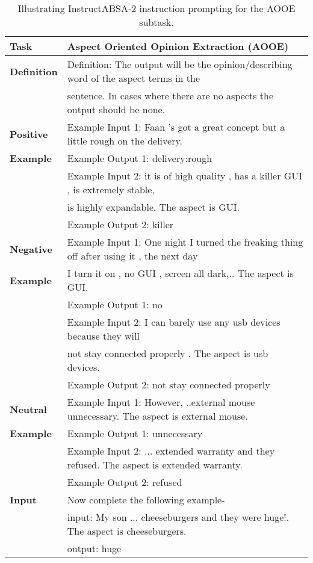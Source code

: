 \documentclass[11pt]{article}
\newcommand{\name}{\textsc{I}nstruct\textsc{ABSA}\xspace}
\begin{document}
\begin{table*}[]
\resizebox{\linewidth}{!}
{
\begin{tabular}{ll}
\hline
\textbf{Task} & Aspect Oriented Opinion Extraction (AOOE) \\ 
\hline                                                  
\textbf{Definition} & Definition: The output will be the opinion/describing word of the aspect terms in the \\
& sentence. In cases where there are no aspects the output should be none. \\ 
\hline                                          
\textbf{Positive}   & Example Input 1: Faan 's got a great concept but a little rough on the delivery. \\ 
\textbf{Example}    &  Example Output 1: delivery:rough           \\
\textbf{}           & Example Input 2: it is of high quality , has a killer GUI , is extremely stable,\\
\textbf{}           &is highly expandable. The aspect is GUI.\\
\textbf{}           & Example Output 2: killer                                              \\ 
\hline                             
\textbf{Negative}   & Example Input 1: One night I turned the freaking thing off after using it , the next day \\
\textbf{Example}    & I turn it on , no GUI , screen all dark,.. The aspect is GUI.                      \\
\textbf{}           & Example Output 1: no                                             \\
\textbf{}           & Example Input 2: I can barely use any usb devices because they will     \\
\textbf{}           & not stay connected properly . The aspect is usb devices.                \\
\textbf{}           & Example Output 2: not stay connected properly                     \\ 
\hline
\textbf{Neutral}    & Example Input 1: However, ..external mouse unnecessary. The aspect is external mouse. \\
\textbf{Example}    & Example Output 1: unnecessary         \\                                        
\textbf{}           & Example Input 2: ... extended warranty and they refused. The aspect is extended warranty. \\ 
\textbf{}           & Example Output 2: refused                                   \\ 
\hline
\textbf{Input}      & Now complete the following example-                                \\
\textbf{}           & input: My son ... cheeseburgers and they were huge!. The aspect is cheeseburgers. \\
                    & output: huge\\ \hline
\end{tabular}
}
\caption{
     Illustrating \name{}-2 instruction prompting for the AOOE subtask.}
\label{tab:aooe_ip}
\end{table*} 
\end{document}
